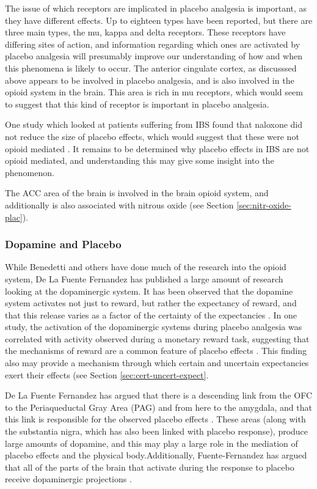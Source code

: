 The issue of which receptors are implicated in placebo analgesia is important, as they have different effects. Up to eighteen types have been reported, but there are three main types, the mu, kappa and delta receptors. These receptors have differing sites of action, and information regarding which ones are activated by placebo analgesia will presumably improve our understanding of how and when this phenomena is likely to occur.  The anterior cingulate cortex, as discusssed above appears to be involved in placebo analgesia, and is also involved in the opioid system in the brain. This area is rich in mu receptors, which would seem to suggest that this kind of receptor is important in placebo analgesia.

One study which looked at patients suffering from IBS found that naloxone did not reduce the size of placebo effects, which would suggest that these were not opioid mediated \cite{Vase2005}. It remains to be determined why placebo effects in IBS are not opioid mediated, and understanding this may give some insight into the phenomenon. 

The ACC area of the brain is involved in the brain opioid system, and additionally is also associated with nitrous oxide (see Section \ref{sec:nitr-oxide-plac}). 

\subsubsection{Dopamine and Placebo}
\label{sec:dopamine-placebo}

While Benedetti and others have done much of the research into the opioid system, De La Fuente Fernandez \cite{DeLaFuente-FernAndez2002} has published a large amount of research looking at the dopaminergic system. It has been observed that the dopamine system activates not just to reward, but rather the expectancy of reward, and that this release varies as a factor of the certainty of the expectancies \cite{Scott2007}. In one study, the activation of the dopaminergic systems during placebo analgesia was correlated with activity observed during a monetary reward task, suggesting that the mechanisms of reward are a common feature of placebo effects \cite{Scott2007a}. This finding also may provide a mechanism through which certain and uncertain expectancies exert their effects (see Section \ref{sec:cert-uncert-expect}.   

De La Fuente Fernandez has argued that there is a descending link from the OFC to the Periaqueductal Gray Area (PAG) and from here to the amygdala, and that this link is responsible for the observed placebo effects \cite{Fuente-Fernandez2002}. These areas (along with the substantia nigra, which has also been linked with placebo response), produce large amounts of dopamine, and this may play a large role in the mediation of placebo effects and the physical body.Additionally, Fuente-Fernandez has argued that all of the parts of the brain that activate during the response to placebo receive dopaminergic projections \cite{Fuente-Fernandez2002}.  

